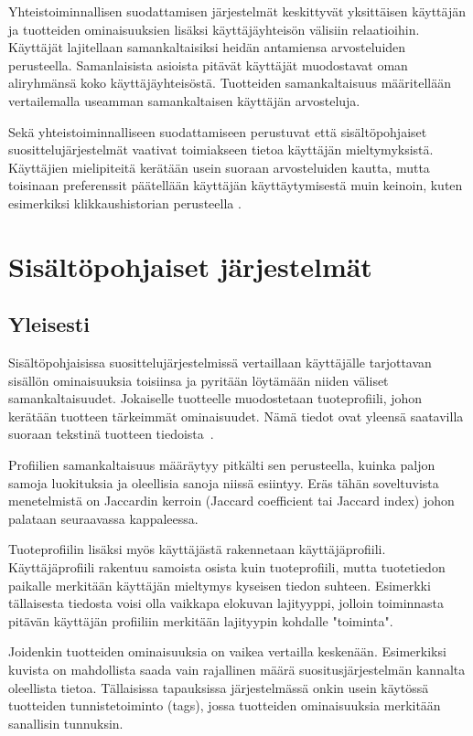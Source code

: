 \documentclass[12pt,finnish]{tktltiki2}
\theoremstyle{definition}
\theoremstyle{remark}
\begin{document}
        Yhteistoiminnallisen suodattamisen järjestelmät keskittyvät yksittäisen käyttäjän ja tuotteiden ominaisuuksien lisäksi käyttäjäyhteisön välisiin relaatioihin. Käyttäjät lajitellaan samankaltaisiksi heidän antamiensa arvosteluiden perusteella. Samanlaisista asioista pitävät käyttäjät muodostavat oman aliryhmänsä koko käyttäjäyhteisöstä. Tuotteiden samankaltaisuus määritellään vertailemalla useamman samankaltaisen käyttäjän arvosteluja.
        
        Sekä yhteistoiminnalliseen suodattamiseen perustuvat että sisältöpohjaiset suosittelujärjestelmät vaativat toimiakseen tietoa käyttäjän mieltymyksistä. Käyttäjien mielipiteitä kerätään usein suoraan arvosteluiden kautta, mutta toisinaan preferenssit päätellään käyttäjän käyttäytymisestä muin keinoin, kuten esimerkiksi klikkaushistorian perusteella \cite{Das:2007:GNP:1242572.1242610}.
        
\section{Sisältöpohjaiset järjestelmät}
        
\subsection{Yleisesti}

Sisältöpohjaisissa suosittelujärjestelmissä vertaillaan käyttäjälle tarjottavan sisällön ominaisuuksia toisiinsa ja pyritään löytämään niiden väliset samankaltaisuudet.
Jokaiselle tuotteelle muodostetaan tuoteprofiili, johon kerätään tuotteen tärkeimmät ominaisuudet. Nämä tiedot ovat yleensä saatavilla suoraan tekstinä tuotteen tiedoista~\cite{Ullman}.

Profiilien samankaltaisuus määräytyy pitkälti sen perusteella, kuinka paljon samoja luokituksia ja oleellisia sanoja niissä esiintyy. Eräs tähän soveltuvista menetelmistä on Jaccardin kerroin (Jaccard coefficient tai Jaccard index) johon palataan seuraavassa kappaleessa.

Tuoteprofiilin lisäksi myös käyttäjästä rakennetaan käyttäjäprofiili. Käyttäjäprofiili rakentuu samoista osista kuin tuoteprofiili, mutta tuotetiedon paikalle merkitään käyttäjän mieltymys kyseisen tiedon suhteen. Esimerkki tällaisesta tiedosta voisi olla vaikkapa elokuvan lajityyppi, jolloin toiminnasta pitävän käyttäjän profiiliin merkitään lajityypin kohdalle "toiminta".

Joidenkin tuotteiden ominaisuuksia on vaikea vertailla keskenään. Esimerkiksi kuvista on mahdollista saada vain rajallinen määrä suositusjärjestelmän kannalta oleellista tietoa. Tällaisissa tapauksissa järjestelmässä onkin usein käytössä tuotteiden tunnistetoiminto (tags), jossa tuotteiden ominaisuuksia merkitään sanallisin tunnuksin.
\end{document}
